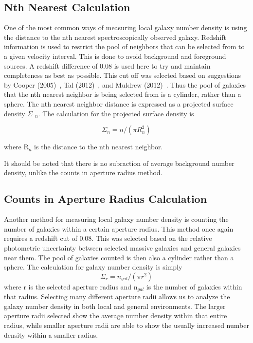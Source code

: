 \documentclass[apj]{emulateapj}
\begin{document}
\subsection{Nth Nearest Calculation}

One of the most common ways of measuring local galaxy number density is using the distance to the nth nearest spectroscopically observed galaxy. Redshift information is used to restrict the pool of neighbors that can be selected from to a given velocity interval. This is done to avoid background and foreground sources. A redshift difference of 0.08 is used here to try and maintain completeness as best as possible. This cut off was selected based on suggestions by Cooper (2005)~\cite{2005ApJ...634..833C}, Tal (2012)~\cite{2012ApJ...751L...5T}, and Muldrew (2012)~\cite{2012MNRAS.419.2670M}. Thus the pool of galaxies that the nth nearest neighbor is being selected from is a cylinder, rather than a sphere. The nth nearest neighbor distance is expressed as a projected surface density $\Sigma$ $_{n}$. The calculation for the projected surface density is

 $$\Sigma_{n} = n / (\pi  R_{n}^{2})$$

 where R$_{n}$ is the distance to the nth nearest neighbor. 

It should be noted that there is no subraction of average background number density, unlike the counts in aperture radius method.



\subsection{Counts in Aperture Radius Calculation}

Another method for measuring local galaxy number density is counting the number of galaxies within a certain aperture radius. This method once again requires a redshift cut of 0.08. This was selected based on the relative photometric uncertainty between selected massive galaxies and general galaxies near them. The pool of galaxies counted is then also a cylinder rather than a sphere. The calculation for galaxy number density is simply
 $$\Sigma_{r} = n_{gal} / (\pi r^{2})$$
 where r is the selected aperture radius and n$_{gal}$ is the number of galaxies within that radius. Selecting many different aperture radii allows us to analyze the galaxy number density in both local and general environments. The larger aperture radii selected show the average number density within that entire radius, while smaller aperture radii are able to show the usually increased number density within a smaller radius.
\end{document}
